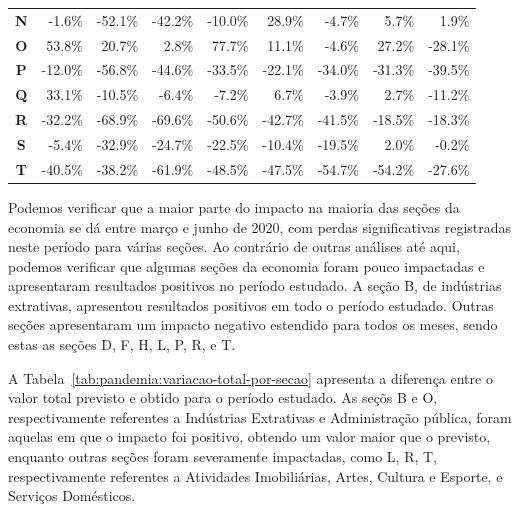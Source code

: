 \begin{table}[htb]
\begin{tabular}{c|r|r|r|r|r|r|r|r}
        \textbf{N} &  -1.6\% & -52.1\% & -42.2\% & -10.0\% &  28.9\% &  -4.7\% &   5.7\% &   1.9\% \\
        \textbf{O} &  53.8\% &  20.7\% &   2.8\% &  77.7\% &  11.1\% &  -4.6\% &  27.2\% & -28.1\% \\
        \textbf{P} & -12.0\% & -56.8\% & -44.6\% & -33.5\% & -22.1\% & -34.0\% & -31.3\% & -39.5\% \\
        \textbf{Q} &  33.1\% & -10.5\% &  -6.4\% &  -7.2\% &   6.7\% &  -3.9\% &   2.7\% & -11.2\% \\
        \textbf{R} & -32.2\% & -68.9\% & -69.6\% & -50.6\% & -42.7\% & -41.5\% & -18.5\% & -18.3\% \\
        \textbf{S} &  -5.4\% & -32.9\% & -24.7\% & -22.5\% & -10.4\% & -19.5\% &   2.0\% &  -0.2\% \\
        \textbf{T} & -40.5\% & -38.2\% & -61.9\% & -48.5\% & -47.5\% & -54.7\% & -54.2\% & -27.6\% \\
        \bottomrule
    \end{tabular}
\fdadospesquisa
\end{table}

Podemos verificar que a maior parte do impacto na maioria das seções da economia se dá entre março e junho de 2020, com perdas significativas registradas neste período para várias seções. Ao contrário de outras análises até aqui, podemos verificar que algumas seções da economia foram pouco impactadas e apresentaram resultados positivos no período estudado. A seção B, de indústrias extrativas, apresentou resultados positivos em todo o período estudado. Outras seções apresentaram um impacto negativo estendido para todos os meses, sendo estas as seções D, F, H, L, P, R, e T.

A Tabela~\ref{tab:pandemia:variacao-total-por-secao} apresenta a diferença entre o valor total previsto e obtido para o período estudado. As seçõs B e O, respectivamente referentes a Indústrias Extrativas e Administração pública, foram aquelas em que o impacto foi positivo, obtendo um valor maior que o previsto, enquanto outras seções foram severamente impactadas, como L, R, T, respectivamente referentes a Atividades Imobiliárias, Artes, Cultura e Esporte, e Serviços Domésticos.

